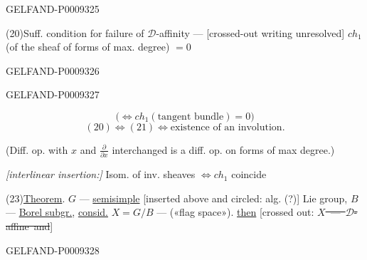 \begin{GelfandAdjacentEvidence}{GELFAND-P000932}{5}


(20)\quad Suff. condition for failure of $\mathcal D$-affinity --- [crossed-out writing unresolved] $ch_1$ (of the sheaf of forms of max. degree) $=0$
\end{GelfandAdjacentEvidence}
\begin{GelfandAdjacentEvidence}{GELFAND-P000932}{6}

\end{GelfandAdjacentEvidence}
\begin{GelfandAdjacentEvidence}{GELFAND-P000932}{7}

\begin{equation*}
 \bigl(\Leftrightarrow ch_1(\text{tangent bundle})=0\bigr)
 \tag{21}
\end{equation*}
\begin{equation*}
 (20)\Leftrightarrow(21)\Leftrightarrow\text{existence of an involution.}
 \tag{22}
\end{equation*}

(Diff. op. with $x$ and $\frac{\partial}{\partial x}$ interchanged is a diff. op. on forms of max degree.)

\textit{[interlinear insertion:]} Isom. of inv. sheaves $\Leftrightarrow ch_1$ coincide

(23)\quad \underline{Theorem}. $G$ --- \underline{semisimple} [inserted above and circled: alg. (?)] Lie group,
$B$ --- \underline{Borel subgr.},
\underline{consid.} $X=G/B$ --- («flag space»). \underline{then}
[crossed out: \sout{\mbox{$X$ --- $\mathcal D$-affine and}}]
\end{GelfandAdjacentEvidence}
\begin{GelfandAdjacentEvidence}{GELFAND-P000932}{8}

\end{GelfandAdjacentEvidence}

